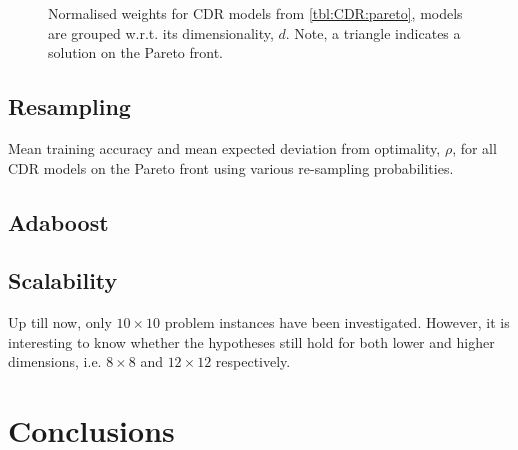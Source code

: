 \documentclass[smallextended]{svjour3}
\begin{document}
\begin{figure}
\centering
{}%
\caption{Normalised weights for CDR models from \cref{tbl:CDR:pareto}, models are grouped w.r.t. its dimensionality, $d$. Note, a triangle indicates a solution on the Pareto front.}\label{fig:CDR:weights}
\end{figure}

\subsection{Resampling}

\begin{table}
    \caption{Mean training accuracy and mean expected deviation from optimality, $\rho$, for all CDR models on the Pareto front using various re-sampling probabilities.}\label{tbl:CDR:pareto:all}
    
\end{table}


\subsection{Adaboost}\label{sec:expr:adaboost}
\subsection{Scalability}\label{sec:scalability}
Up till now, only $10\times10$ problem instances have been investigated. However, it is interesting to know whether the hypotheses still hold for both lower and higher dimensions, i.e. $8\times8$ and $12\times12$ respectively.


\section{Conclusions}
\end{document}
